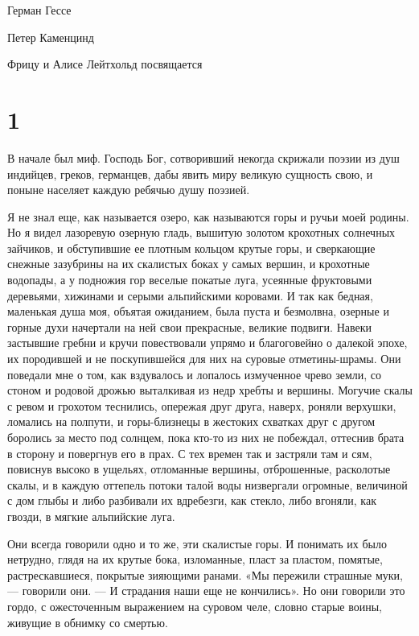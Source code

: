 
Герман Гессе

Петер Каменцинд



Фрицу и Алисе Лейтхольд посвящается


\section*{1}


В начале был миф. Господь  Бог, сотворивший некогда скрижали поэзии из
душ  индийцев, греков,  германцев,  дабы явить  миру великую  сущность
свою, и поныне населяет каждую ребячью душу поэзией.

Я не знал еще, как называется  озеро, как называются горы и ручьи моей
родины. Но я видел лазоревую  озерную гладь, вышитую золотом крохотных
солнечных зайчиков,  и обступившие ее  плотным кольцом крутые  горы, и
сверкающие снежные зазубрины  на их скалистых боках у  самых вершин, и
крохотные водопады,  а у подножия  гор веселые покатые  луга, усеянные
фруктовыми деревьями,  хижинами и  серыми альпийскими коровами.  И так
как  бедная,  маленькая душа  моя,  объятая  ожиданием, была  пуста  и
безмолвна, озерные  и горные  духи начертали  на ней  свои прекрасные,
великие подвиги. Навеки застывшие гребни и кручи повествовали упрямо и
благоговейно о далекой эпохе, их породившей и не поскупившейся для них
на суровые  отметины-шрамы. Они поведали  мне о том, как  вздувалось и
лопалось измученное чрево земли, со стоном и родовой дрожью выталкивая
из недр хребты и вершины. Могучие  скалы с ревом и грохотом теснились,
опережая друг друга,  наверх, роняли верхушки, ломались  на полпути, и
горы-близнецы в жестоких схватках друг  с другом боролись за место под
солнцем, пока  кто-то из них не  побеждал, оттеснив брата в  сторону и
повергнув его в прах. С тех времен  так и застряли там и сям, повиснув
высоко в ущельях, отломанные вершины, отброшенные, расколотые скалы, и
в каждую оттепель  потоки талой воды низвергали  огромные, величиной с
дом глыбы и либо разбивали их вдребезги, как стекло, либо вгоняли, как
гвозди, в мягкие альпийские луга.

Они всегда  говорили одно и то  же, эти скалистые горы.  И понимать их
было нетрудно, глядя на их  крутые бока, изломанные, пласт за пластом,
помятые,  растрескавшиеся,  покрытые  зияющими  ранами.  «Мы  пережили
страшные  муки,  ---  говорили  они.  ---  И  страдания  наши  еще  не
кончились». Но  они говорили это  гордо, с ожесточенным  выражением на
суровом челе, словно старые воины, живущие в обнимку со смертью.


